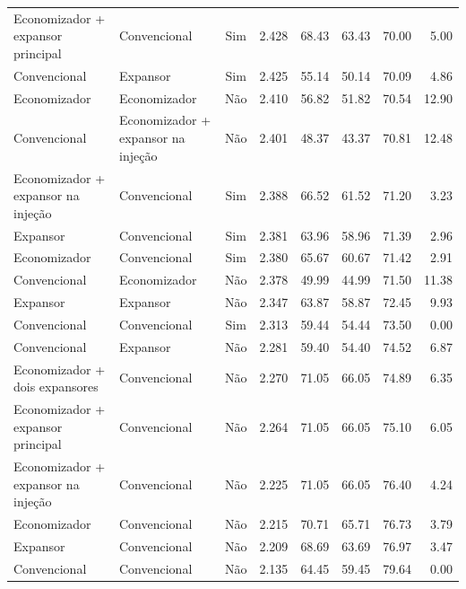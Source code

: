 {\begin{tabular}{llcrrrrr}
Economizador + expansor principal & Convencional & Sim & 2.428 & 68.43 & 63.43 & 70.00 & 5.00 \\
Convencional & Expansor & Sim & 2.425 & 55.14 & 50.14 & 70.09 & 4.86 \\
Economizador & Economizador & Não & 2.410 & 56.82 & 51.82 & 70.54 & 12.90 \\
Convencional & Economizador + expansor na injeção & Não & 2.401 & 48.37 & 43.37 & 70.81 & 12.48 \\
Economizador + expansor na injeção & Convencional & Sim & 2.388 & 66.52 & 61.52 & 71.20 & 3.23 \\
Expansor & Convencional & Sim & 2.381 & 63.96 & 58.96 & 71.39 & 2.96 \\
Economizador & Convencional & Sim & 2.380 & 65.67 & 60.67 & 71.42 & 2.91 \\
Convencional & Economizador & Não & 2.378 & 49.99 & 44.99 & 71.50 & 11.38 \\
Expansor & Expansor & Não & 2.347 & 63.87 & 58.87 & 72.45 & 9.93 \\
Convencional & Convencional & Sim & 2.313 & 59.44 & 54.44 & 73.50 & 0.00 \\
Convencional & Expansor & Não & 2.281 & 59.40 & 54.40 & 74.52 & 6.87 \\
Economizador + dois expansores & Convencional & Não & 2.270 & 71.05 & 66.05 & 74.89 & 6.35 \\
Economizador + expansor principal & Convencional & Não & 2.264 & 71.05 & 66.05 & 75.10 & 6.05 \\
Economizador + expansor na injeção & Convencional & Não & 2.225 & 71.05 & 66.05 & 76.40 & 4.24 \\
Economizador & Convencional & Não & 2.215 & 70.71 & 65.71 & 76.73 & 3.79 \\
Expansor & Convencional & Não & 2.209 & 68.69 & 63.69 & 76.97 & 3.47 \\
Convencional & Convencional & Não & 2.135 & 64.45 & 59.45 & 79.64 & 0.00 \\
\bottomrule
\end{tabular}
}
